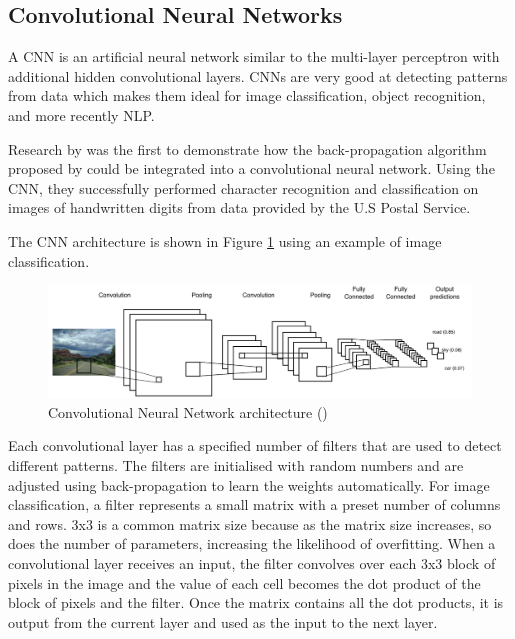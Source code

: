 
\clearpage
\subsection{Convolutional Neural Networks}


A \acrfull{CNN} is an artificial neural network similar to the multi-layer perceptron with additional hidden convolutional layers. \acrshort{CNN}s are very good at detecting patterns from data which makes them ideal for image classification, object recognition, and more recently \acrfull{NLP}.

Research by \cite{lecun_backprop_cnn_1989} was the first to demonstrate how the back-propagation algorithm proposed by \cite{rumelhart_learning_1986} could be integrated into a convolutional neural network.
Using the \acrshort{CNN}, they successfully performed character recognition and classification on images of handwritten digits from data provided by the U.S Postal Service.

The \acrshort{CNN} architecture is shown in Figure \ref{fig:cnn_1} using an example of image classification.

\begin{figure}[ht!]
\centering
\includegraphics[width=1\textwidth]{media/literature/machine_learning/ml_cnn_1.png}
\caption[Diagram of a convolutional neural network architecture]{Convolutional Neural Network architecture (\cite{lopez_deep_2017})}
\label{fig:cnn_1}
\end{figure}

Each convolutional layer has a specified number of filters that are used to detect different patterns. The filters are initialised with random numbers and are adjusted using back-propagation to learn the weights automatically. For image classification, a filter represents a small matrix with a preset number of columns and rows. 3x3 is a common matrix size because as the matrix size increases, so does the number of parameters, increasing the likelihood of overfitting. When a convolutional layer receives an input, the filter convolves over each 3x3 block of pixels in the image and the value of each cell becomes the dot product of the block of pixels and the filter. Once the matrix contains all the dot products, it is output from the current layer and used as the input to the next layer.

